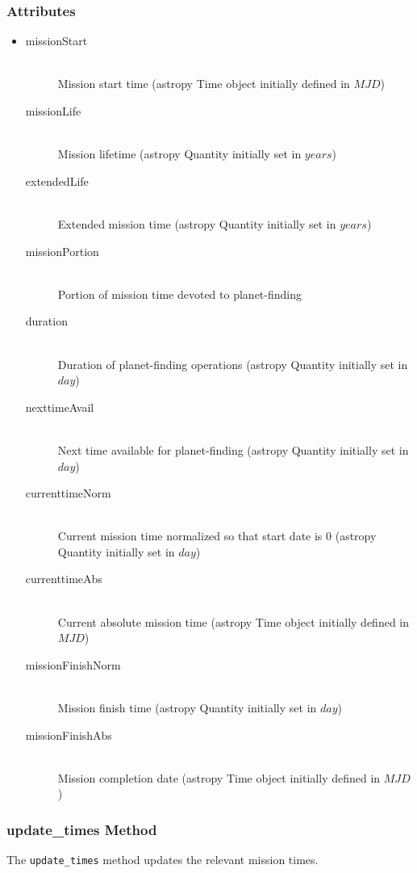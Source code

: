\documentclass[cleanfoot]{asme2ej}
\begin{document}
\subsubsection*{Attributes}
\begin{itemize}
    \item
    \begin{description}
        \item[missionStart] \hfill \\
        Mission start time (astropy Time object initially defined in $ MJD $)
        \item[missionLife] \hfill \\
        Mission lifetime (astropy Quantity initially set in $ years $)
        \item[extendedLife] \hfill \\
        Extended mission time (astropy Quantity initially set in $ years $)
        \item[missionPortion] \hfill \\
        Portion of mission time devoted to planet-finding
        \item[duration] \hfill \\
        Duration of planet-finding operations (astropy Quantity initially set in $ day $)
        \item[nexttimeAvail] \hfill \\
        Next time available for planet-finding (astropy Quantity initially set in $ day $)
        \item[currenttimeNorm] \hfill \\
        Current mission time normalized so that start date is 0 (astropy Quantity initially set in $ day $)
        \item[currenttimeAbs] \label{sec:currenttime}\hfill \\
        Current absolute mission time (astropy Time object initially defined in $ MJD $)
        \item[missionFinishNorm] \hfill \\
        Mission finish time (astropy Quantity initially set in $ day $)
        \item[missionFinishAbs] \hfill \\
        Mission completion date (astropy Time object initially defined in $ MJD $)
    \end{description}
\end{itemize}

\subsubsection{update\_times Method} \label{sec:updatetimestask}
The \verb+update_times+ method updates the relevant mission times.
\end{document}
